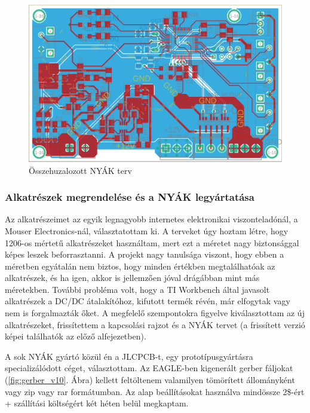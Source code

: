 \documentclass[../main.tex]{subfiles}
\begin{document}
            \begin{figure}[h!]
                \centering
                    \includegraphics[width=12cm]{resources/pcb_res/board_v02.png}
                \caption{Összehuzalozott NYÁK terv}
                \label{fig:board_v02}
            \end{figure}
            
        \subsubsection{Alkatrészek megrendelése és a NYÁK legyártatása}
            
            Az alkatrészeimet az egyik legnagyobb internetes elektronikai viszonteladónál, a Mouser Electronics-nál, választatottam ki. A terveket úgy hoztam létre, hogy 1206-os mértetű alkatrészeket használtam, mert ezt a méretet nagy biztonsággal képes leszek beforrasztanni. A projekt nagy tanulsága viszont, hogy ebben a méretben egyátalán nem biztos, hogy minden értékben megtalálhatóak az alkatrészek, és ha igen, akkor is jellemzően jóval drágábban mint más méretekben. További probléma volt, hogy a TI Workbench által javasolt alkatrészek a DC/DC átalakítóhoz, kifutott termék révén, már elfogytak vagy nem is forgalmazták őket. A megfelelő szempontokra figyelve kiválasztottam az új alkatrészeket, frissítettem a kapcsolási rajzot és a NYÁK tervet (a frissített verzió képei találhatók az előző alfejezetben). 
            
            A sok NYÁK gyártó közül én a JLCPCB-t, egy prototípusgyártásra specializálódott céget, választottam. Az EAGLE-ben kigenerált gerber fáljokat (\ref{fig:gerber_v10}. Ábra) kellett feltöltenem valamilyen tömörített állományként vagy zip vagy rar formátumban. Az alap beállításokat használva mindössze 2\$-ért + szállítási költségért két héten belül megkaptam.
            
\end{document}
